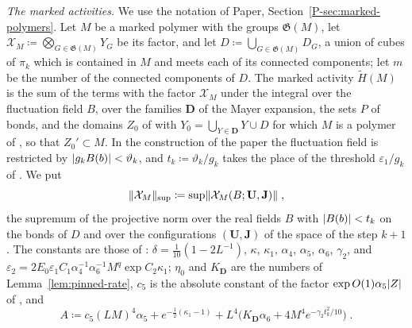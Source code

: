 \documentclass[11pt]{preprint}
\DeclarePairedDelimiter{\abs}{\lvert}{\rvert}
\DeclarePairedDelimiter{\norm}{\lVert}{\rVert}
\numberwithin{equation}{section}
\theoremstyle{definition}
\theoremstyle{remark}
\theoremstyle{plain}
\begin{document}
\emph{The marked activities.} We use the notation of Paper, Section~\ref{P-sec:marked-polymers}. Let $M$ be a marked polymer with the groups $\mathfrak G(M)$, let $\mathcal X_M \coloneqq \bigotimes_{G \in \mathfrak G(M)}Y_G$ be its factor, and let $D \coloneqq \bigcup_{G \in \mathfrak G(M)}D_G$, a union of cubes of $\pi_k$ which is contained in $M$ and meets each of its connected components; let $m$ be the number of the connected components of $D$. The marked activity $\tilde H(M)$ is the sum of the terms \cite[(2.14), p.~15]{BalabanRG2} with the factor $\mathcal X_M$ under the integral over the fluctuation field $B$, over the families $\mathbf D$ of the Mayer expansion, the sets $P$ of bonds, and the domains $Z_0$ of \cite[(2.1)--(2.3)]{BalabanRG2} with $Y_0 = \bigcup_{Y \in \mathbf D}Y \cup D$ for which $M$ is a polymer of \cite[(2.8)]{BalabanRG2}, so that $Z_0' \subset M$. In the construction of the paper the fluctuation field is restricted by $\abs{g_kB(b)} < \vartheta_k$, and $t_k \coloneqq \vartheta_k/g_k$ takes the place of the threshold $\varepsilon_1/g_k$ of \cite[(2.3), (2.22)]{BalabanRG2}. We put
\begin{equation}\label{eq:marked-factor-sup}
    \norm{\mathcal X_M}_{\sup} \coloneqq \sup\norm{\mathcal X_M(B; \mathbf U, \mathbf J)}\;,
\end{equation}
the supremum of the projective norm over the real fields $B$ with $\abs{B(b)} < t_k$ on the bonds of $D$ and over the configurations $(\mathbf U, \mathbf J)$ of the space of the step $k + 1$. The constants are those of \cite[pp.~16--21]{BalabanRG2}: $\delta = \frac{1}{10}(1 - 2L^{-1})$, $\kappa$, $\kappa_1$, $\alpha_4$, $\alpha_5$, $\alpha_6$, $\gamma_2$, and $\varepsilon_2 = 2E_0\varepsilon_1C_1\alpha_4^{-1}\alpha_6^{-1}M^q\exp C_2\kappa_1$; $\eta_0$ and $K_{\mathbf D}$ are the numbers of Lemma~\ref{lem:pinned-rate}, $c_5$ is the absolute constant of the factor $\exp O(1)\alpha_5\abs Z$ of \cite[(2.26)]{BalabanRG2}, and
\begin{equation}\label{eq:marked-entropy-constant}
    A \coloneqq c_5(LM)^4\alpha_5 + e^{-\frac12(\kappa_1 - 1)} + L^4\bigl(K_{\mathbf D}\alpha_6 + 4M^4e^{-\gamma_2t_k^2/10}\bigr)\;.
\end{equation}
\end{document}
